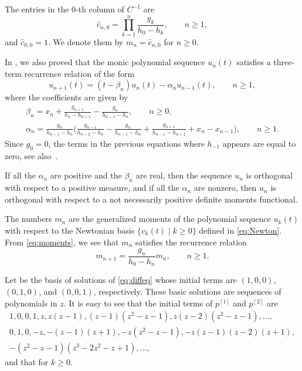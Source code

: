 \documentclass[pdftex]{sigma}
\def\hc{\hat c}
\numberwithin{equation}{section}
\begin{document}
	 The entries in the 0-th column of $C^{-1}$ are
\begin{equation}\label{eq:moments}
 \hc_{n,0} =\prod_{k=1}^n \frac{g_k}{h_0-h_k}, \qquad n \ge 1,
	\end{equation}
and $\hc_{0,0}=1$. We denote them by $m_n=\hc_{n,0}$ for $ n \ge 0$.

In \cite{Uni}, we also proved that the monic polynomial sequence $u_n(t)$ satisfies a three-term recurrence relation of the form
\begin{equation}\label{eq:3term}
	u_{n+1}(t)= (t-\beta_n) u_n(t) - \alpha_n u_{n-1}(t), \qquad n \ge 1,
\end{equation}
where the coefficients are given by
\begin{gather}\label{eq:beta}
	\beta_n= x_n + \frac{g_{n+1}}{h_n - h_{n+1}} -\frac{g_n}{h_{n-1} - h_n}, \qquad n\ge 0,
\\
\label{eq:alpha}
 \alpha_n = \frac{g_n}{h_{n-1} -h_n} \biggl(\frac{g_{n-1}}{h_{n-2} - h_n} - \frac{g_n}{h_{n-1} - h_n} + \frac{g_{n+1}}{h_{n-1}-h_{n+1}} +x_n - x_{n-1} \biggr), \qquad n\ge 1.\!\!
\end{gather}
Since $g_0=0$, the terms in the previous equations where $h_{-1}$ appears are equal to zero, see also~\mbox{\cite[Remark~2.5]{K3}}.

If all the $\alpha_n$ are positive and the $\beta_n$ are real, then the sequence $u_n$ is orthogonal with respect to a positive measure, and if all the $\alpha_n$ are nonzero, then $u_n$ is orthogonal with respect to a not necessarily positive definite moments functional.

The numbers $m_n$ are the generalized moments of the polynomial sequence $u_k(t)$ with respect to the Newtonian basis $\{ v_k(t)\mid k \ge 0 \}$ defined in \eqref{eq:Newton}.
From \eqref{eq:moments}, we see that $m_n$ satisfies the recurrence relation
\[
	 m_{n+1}=\dfrac{g_n}{h_0 -h_n} m_n, \qquad n\ge 1.
 \]

Let  be the basis of solutions of \eqref{eq:diffeq} whose initial terms are $(1,0,0)$, $(0,1,0)$, and $(0,0,1)$, respectively.
These basic solutions are sequences of polynomials in $z$. It is easy to see that the initial terms of $p^{[1]}$ and $p^{[2]}$ are
\begin{gather*}
1,0,0,1,z,z (z-1), (z-1)(z^2-z-1),z (z-2)(z^2-z-1), \dots,
\\
0,1,0,-z, -(z-1)(z+1), -z(z^2-z-1), -z(z-1)(z-2)(z+1),\\
 -(z^2-z-1)(z^3-2 z^2 -z+1), \dots,
\end{gather*}
and that  for $k \ge 0$.
\end{document}
